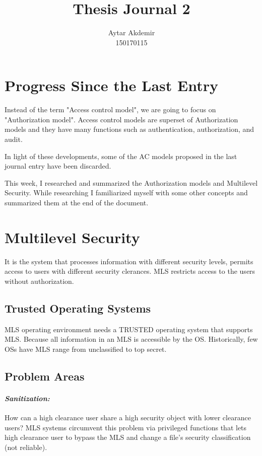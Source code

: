 \documentclass[11pt]{article} %
\title{Thesis Journal 2}
\author{Aytar Akdemir \\ 150170115}
\begin{document}
\maketitle

\section{Progress Since the Last Entry}

Instead of the term "Access control model", we are going to focus on "Authorization model". Access control models are superset of Authorization models and they have many functions such as  authentication, authorization, and audit.

In light of these developments, some of the AC models proposed in the last journal entry have been discarded.

This week, I researched and summarized the Authorization models and Multilevel Security. While researching I familiarized myself with some other concepts and summarized them at the end of the document.



\section{Multilevel Security}

It is the system that processes information with different security levels, permits access to users with different security clerances. MLS restricts access to the users without authorization.

\subsection{Trusted Operating Systems}

MLS operating environment needs a TRUSTED operating system that supports MLS. Because all information in an MLS  is accessible by the OS. Historically, few OSs have MLS range from unclassified to top secret.

\subsection{Problem Areas}

\paragraph{\textit{Sanitization:}} How can a high clearance user share a high security object with lower clearance users? MLS systems circumvent this problem via privileged functions that lets high clearance user  to bypass the MLS and change a file's security classification (not reliable). 
\end{document}

